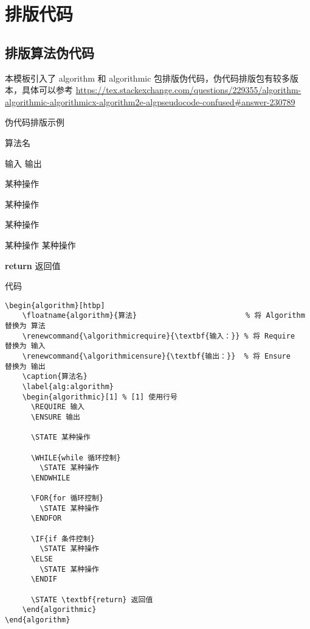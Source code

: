 \section{排版代码}

\subsection{排版算法伪代码}

本模板引入了 algorithm 和 algorithmic 包排版伪代码，伪代码排版包有较多版本，具体可以参考 \url{https://tex.stackexchange.com/questions/229355/algorithm-algorithmic-algorithmicx-algorithm2e-algpseudocode-confused#answer-230789}

伪代码排版示例

\begin{algorithm}[htbp]
    \renewcommand{\algorithmicrequire}{\textbf{输入：}} %
    \renewcommand{\algorithmicensure}{\textbf{输出：}}  %
    \caption{算法名}
    \label{alg:algorithm1}
    \begin{algorithmic}[1] %
      \REQUIRE 输入
      \ENSURE 输出

      \STATE 某种操作

        \STATE 某种操作
      \ENDWHILE

        \STATE 某种操作
      \ENDFOR

        \STATE 某种操作
      \ELSE
        \STATE 某种操作
      \ENDIF

      \STATE \textbf{return} 返回值
    \end{algorithmic}
\end{algorithm}

代码

\begin{lstlisting}[breaklines=true,]
\begin{algorithm}[htbp]
    \floatname{algorithm}{算法}                         % 将 Algorithm 替换为 算法
    \renewcommand{\algorithmicrequire}{\textbf{输入：}} % 将 Require   替换为 输入
    \renewcommand{\algorithmicensure}{\textbf{输出：}}  % 将 Ensure    替换为 输出
    \caption{算法名}
    \label{alg:algorithm}
    \begin{algorithmic}[1] % [1] 使用行号
      \REQUIRE 输入
      \ENSURE 输出

      \STATE 某种操作

      \WHILE{while 循环控制}
        \STATE 某种操作
      \ENDWHILE

      \FOR{for 循环控制}
        \STATE 某种操作
      \ENDFOR

      \IF{if 条件控制}
        \STATE 某种操作
      \ELSE
        \STATE 某种操作
      \ENDIF

      \STATE \textbf{return} 返回值
    \end{algorithmic}
\end{algorithm}
\end{lstlisting}

